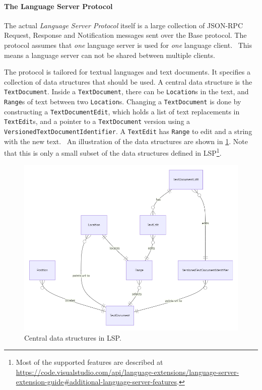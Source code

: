 \paragraph*{The Language Server Protocol}
The actual \emph{Language Server Protocol} itself is a large collection of \gls{JSON-RPC} Request, Response and Notification messages sent over the Base protocol.
The protocol assumes that \textit{one} language server is used for \textit{one} language client.~\cite{microsoftLanguageServerProtocol2020}
This means a language server can not be shared between multiple clients.

The protocol is tailored for textual languages and text documents.
It specifies a collection of data structures that should be used.
A central data structure is the \texttt{TextDocument}.
Inside a \texttt{TextDocument}, there can be \texttt{Location}s in the text, and \texttt{Range}s of text between two \texttt{Location}s.
Changing a \texttt{TextDocument} is done by constructing a \texttt{TextDocumentEdit}, which holds a list of text replacements in \texttt{TextEdit}s, and a pointer to a \texttt{TextDocument} version using a \texttt{VersionedTextDocumentIdentifier}.
A \texttt{TextEdit} has \texttt{Range} to edit and a string with the new text.~\cite{microsoftLanguageServerProtocol2020}
An illustration of the data structures are shown in \cref{fig:lsp-data-structures}.
Note that this is only a small subset of the data structures defined in \gls{LSP}\footnote{Most of the supported features are described at \href{https://code.visualstudio.com/api/language-extensions/language-server-extension-guide\#additional-language-server-features}{https://code.visualstudio.com/api/language-extensions/language-server-extension-guide\#additional-language-server-features}.}.

\begin{figure}[htbp]
  \centering
  \includegraphics[width=\textwidth]{figures/lsp-textdocument-data}
  \caption[LSP Central Data Structures]{Central data structures in \gls{LSP}.}\label{fig:lsp-data-structures}
\end{figure}


